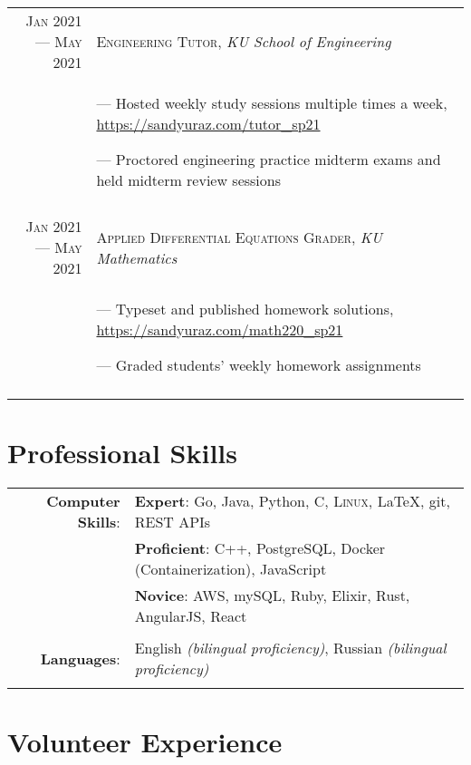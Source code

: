 \documentclass[a4paper, 10pt]{article}
\begin{document}
\begin{tabular}{r|p{12cm}}
	\textsc{Jan 2021 --- May 2021} & \textsc{Engineering Tutor}, \emph{KU School of Engineering}           \\&\footnotesize{
		--- Hosted weekly study sessions multiple times a week, \url{https://sandyuraz.com/tutor_sp21}

		--- Proctored engineering practice midterm exams and held midterm review sessions
	}                                                                                                      \\\multicolumn{2}{c}{}\\

	\textsc{Jan 2021 --- May 2021} & \textsc{Applied Differential Equations Grader}, \emph{KU Mathematics} \\&\footnotesize{
		--- Typeset and published homework solutions, \url{https://sandyuraz.com/math220_sp21}

		--- Graded students' weekly homework assignments
	}                                                                                                      \\\multicolumn{2}{c}{}\\
\end{tabular}

\section{Professional Skills}

\begin{tabular}{rl}
	\textbf{Computer Skills}: &
	\textbf{Expert}: Go, Java, Python, C, \textsc{Linux}, \LaTeX, git, REST APIs                               \\&
	\textbf{Proficient}: C++, PostgreSQL, Docker (Containerization), JavaScript                                \\&
	\textbf{Novice}: AWS, mySQL, Ruby, Elixir, Rust, AngularJS, React                                          \\\\
	\textbf{Languages}:       & English \emph{(bilingual proficiency)}, Russian \emph{(bilingual proficiency)} \\\\
\end{tabular}

\section{Volunteer Experience}
\end{document}
